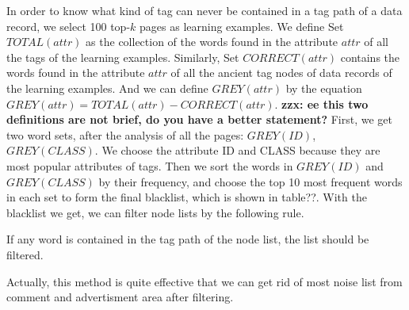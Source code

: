 In order to know what kind of tag can never be contained in a tag path of a data record,
we select 100 top-$k$ pages as learning examples.
We define Set $TOTAL(attr)$ as the collection 
of the words found in the attribute $attr$ of all the tags of the learning examples.
Similarly, Set $CORRECT(attr)$ contains the words
found in the attribute $attr$ of all the ancient tag nodes of data records of the learning examples.
And we can define $GREY(attr)$ by the equation $GREY(attr)=TOTAL(attr)-CORRECT(attr)$.
{\bf zzx: ee this two definitions are not brief, do you have a better statement?}
First,
we get two word sets, after the analysis of all the pages:
$GREY(ID)$,
$GREY(CLASS)$.
We choose the attribute ID and CLASS because they are most popular attributes of tags.
Then we sort the words in $GREY(ID)$ and $GREY(CLASS)$ by their frequency,
and choose the top 10 most frequent words in each set 
to form the final blacklist, which is shown in table??.
With the blacklist we get, we can filter node lists by the following rule.

\begin{newrule}\label{rule-filter}
If any word is contained in the tag path of the node list, the list should be filtered.
\end{newrule}

Actually, this method is quite effective 
that we can get rid of most noise list from comment and advertisment area
after filtering.

